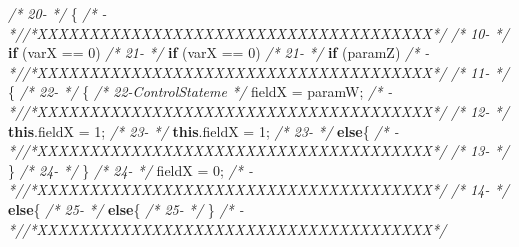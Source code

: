 \documentclass[
]{article}
\newenvironment{Shaded}{\begin{snugshade}}{\end{snugshade}}
\newcommand{\CommentTok}[1]{\textcolor[rgb]{0.56,0.35,0.01}{\textit{#1}}}
\newcommand{\DecValTok}[1]{\textcolor[rgb]{0.00,0.00,0.81}{#1}}
\newcommand{\FunctionTok}[1]{\textcolor[rgb]{0.00,0.00,0.00}{#1}}
\newcommand{\KeywordTok}[1]{\textcolor[rgb]{0.13,0.29,0.53}{\textbf{#1}}}
\newcommand{\NormalTok}[1]{#1}
\begin{document}
\begin{landscape}
\begin{Shaded}
\begin{Highlighting}[]
\CommentTok{/* 20-                 */}\NormalTok{    \{                                                          }\CommentTok{/*   -                 *//*XXXXXXXXXXXXXXXXXXXXXXXXXXXXXXXXXXXXXX*/}                     
\CommentTok{/* 10-                 */}        \KeywordTok{if}\NormalTok{ (varX == }\DecValTok{0}\NormalTok{)                                         }\CommentTok{/* 21-                 */}        \KeywordTok{if}\NormalTok{ (varX == }\DecValTok{0}\NormalTok{)                                         }
\CommentTok{/* 21-                 */}        \KeywordTok{if}\NormalTok{ (paramZ)                                            }\CommentTok{/*   -                 *//*XXXXXXXXXXXXXXXXXXXXXXXXXXXXXXXXXXXXXX*/}                     
\CommentTok{/* 11-                 */}\NormalTok{        \{                                                      }\CommentTok{/* 22-                 */}\NormalTok{        \{                                                      }
\CommentTok{/* 22-ControlStateme   */}\NormalTok{            fieldX = paramW;                                   }\CommentTok{/*   -                 *//*XXXXXXXXXXXXXXXXXXXXXXXXXXXXXXXXXXXXXX*/}                     
\CommentTok{/* 12-                 */}            \KeywordTok{this}\NormalTok{.}\FunctionTok{fieldX}\NormalTok{ = }\DecValTok{1}\NormalTok{;                                   }\CommentTok{/* 23-                 */}            \KeywordTok{this}\NormalTok{.}\FunctionTok{fieldX}\NormalTok{ = }\DecValTok{1}\NormalTok{;                                   }
\CommentTok{/* 23-                 */}        \KeywordTok{else}\NormalTok{\{                                                  }\CommentTok{/*   -                 *//*XXXXXXXXXXXXXXXXXXXXXXXXXXXXXXXXXXXXXX*/}                     
\CommentTok{/* 13-                 */}\NormalTok{        \}                                                                }\CommentTok{/* 24-                 */}\NormalTok{        \}                                                                  }
\CommentTok{/* 24-                 */}\NormalTok{            fieldX = }\DecValTok{0}\NormalTok{;                                        }\CommentTok{/*   -                 *//*XXXXXXXXXXXXXXXXXXXXXXXXXXXXXXXXXXXXXX*/}                     
\CommentTok{/* 14-                 */}        \KeywordTok{else}\NormalTok{\{                                                  }\CommentTok{/* 25-                 */}        \KeywordTok{else}\NormalTok{\{                                                  }
\CommentTok{/* 25-                 */}\NormalTok{        \}                                                      }\CommentTok{/*   -                 *//*XXXXXXXXXXXXXXXXXXXXXXXXXXXXXXXXXXXXXX*/}                     

\end{Highlighting}
\end{Shaded}
\end{landscape}
\end{document}
